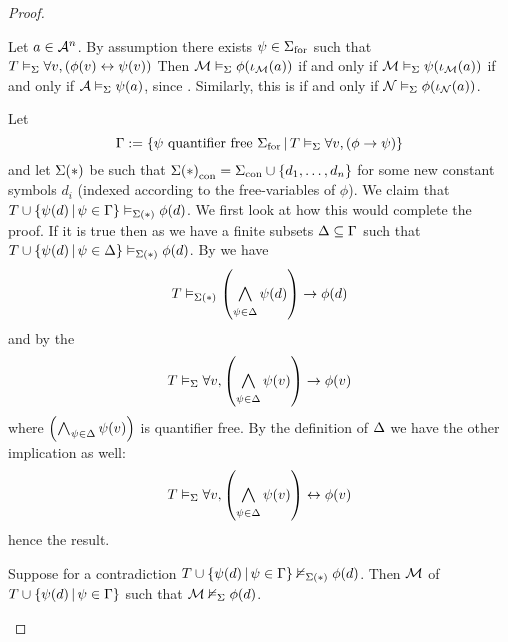 \begin{proof}
    \begin{forward}
        Let $a \in \AA^n$.
        By assumption there exists $\psi \in \form{\Si}$ such that 
        $T \model{\Si} \forall v, \brkt{\phi(v) \IFF \psi(v)}$
        Then $\MM \model{\Si} \phi(\io_\MM(a))$ if and only if 
        $\MM \model{\Si} \psi(\io_\MM(a))$ if and only if 
        $\AA \model{\Si} \psi(a)$, 
        since .
        Similarly, this is if and only if $\NN \model{\Si} \phi(\io_\NN(a))$.
    \end{forward}

    \begin{backward}
        Let 
        \[
            \Ga := \set{\psi \text{ quantifier free } \form{\Si} \st
            T \model{\Si} \forall v, (\phi \to \psi)}
        \]
        and let $\Si(*)$ be such that 
        $\const{\Si(*)} = \const{\Si} \cup \set{d_1,\dots,d_n}$
        for some new constant symbols $d_i$ 
        (indexed according to the free-variables of $\phi$).
        We claim that 
        $T \cup \set{\psi(d) \st \psi \in \Ga} \model{\Si(*)} \phi(d)$.
        We first look at how this would complete the proof.
        If it is true then as 
        we have a finite subsets $\De \subs \Ga$ such that
        $T \cup \set{\psi(d) \st \psi \in \De} \model{\Si(*)} \phi(d)$.
        By  we have
        \[T \model{\Si(*)} \brkt{\bigand{\psi \in \De}{} \psi(d)} \to \phi(d)\]
        and by the 
        \[
            T \model{\Si} \forall v, 
            \brkt{\bigand{\psi \in \De}{} \psi(v)} \to \phi(v) 
        \]
        where $\brkt{\bigand{\psi \in \De}{} \psi(v)}$ is quantifier free.
        By the definition of $\De$ we have the other implication as well:
        \[
            T \model{\Si} \forall v, 
            \brkt{\bigand{\psi \in \De}{} \psi(v)} \IFF \phi(v) 
        \]
        hence the result.

        Suppose for a contradiction 
        $T \cup \set{\psi(d) \st \psi \in \Ga} \nodel{\Si(*)} \phi(d)$.
        Then 
        $\MM$ of $T \cup \set{\psi(d) \st \psi \in \Ga}$ such that 
        $\MM \nodel{\Si} \phi(d)$.


\end{backward}
\end{proof}
